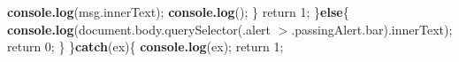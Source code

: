 {\begin{DoxyParamCaption}
                                                    {\bf console.\+log}(msg.\+inner\+Text);                                                                                                                                                                                                                                                                                                                                                                                   {\bf console.\+log}(\textquotesingle{}\textquotesingle{});                                                                                                                                                                                                                                                                                                                   \}                                                                                                                                                                                                                                                                                                                   return 1;                                                                                                                                                                                                                                                                                   \}{\bf else}\{                                                                                                                                                                                                                                                                                                                   {\bf console.\+log}(document.\+body.\+query\+Selector(\textquotesingle{}.alert $>$.passing\+Alert.\+bar\textquotesingle{}).inner\+Text);                                                                                                                                                                                                                                                                                                                   return 0;                                                                                                                                                                                                                                                                                   \}                                                                                                                                                                                                                   \}{\bf catch}(ex)\{                                                                                                                                                                                                                                                                                   {\bf console.\+log}(ex);                                                                                                                                                                                                                                                                                   return 1;                           
\end{DoxyParamCaption}}
